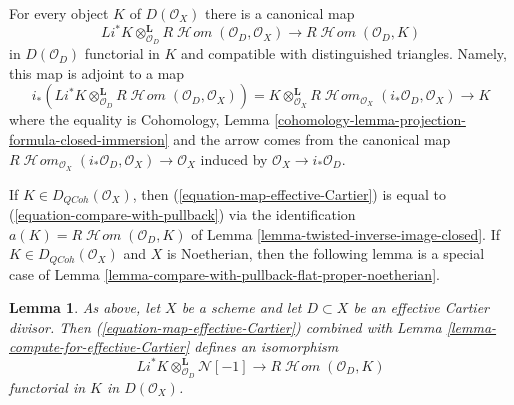 \documentclass{stacks-project}
\theoremstyle{plain}
\newtheorem{lemma}[subsection]{Lemma}
\theoremstyle{definition}
\theoremstyle{remark}
\numberwithin{equation}{subsection}
\def\SheafHom{\mathop{\mathcal{H}\!\mathit{om}}\nolimits}
\def\QCoh{\mathit{QCoh}}
\begin{document}
\noindent
For every object $K$ of $D(\mathcal{O}_X)$ there is a canonical map
\begin{equation}
\label{equation-map-effective-Cartier}
Li^*K
\otimes_{\mathcal{O}_D}^\mathbf{L}
R\SheafHom(\mathcal{O}_D, \mathcal{O}_X)
\longrightarrow
R\SheafHom(\mathcal{O}_D, K)
\end{equation}
in $D(\mathcal{O}_D)$ functorial in $K$ and
compatible with distinguished triangles.
Namely, this map is adjoint to a map
$$
i_*(Li^*K \otimes^\mathbf{L}_{\mathcal{O}_D}
R\SheafHom(\mathcal{O}_D, \mathcal{O}_X)) =
K \otimes^\mathbf{L}_{\mathcal{O}_X}
R\SheafHom_{\mathcal{O}_X}(i_*\mathcal{O}_D, \mathcal{O}_X)
\longrightarrow K
$$
where the equality is
Cohomology, Lemma \ref{cohomology-lemma-projection-formula-closed-immersion}
and the arrow comes from the canonical map
$R\SheafHom_{\mathcal{O}_X}(i_*\mathcal{O}_D, \mathcal{O}_X) \to \mathcal{O}_X$
induced by $\mathcal{O}_X \to i_*\mathcal{O}_D$.

\medskip\noindent
If $K \in D_\QCoh(\mathcal{O}_X)$, then
(\ref{equation-map-effective-Cartier}) is equal to
(\ref{equation-compare-with-pullback}) via the identification
$a(K) = R\SheafHom(\mathcal{O}_D, K)$ of
Lemma \ref{lemma-twisted-inverse-image-closed}.
If $K \in D_\QCoh(\mathcal{O}_X)$ and $X$ is Noetherian, then
the following lemma is a special case of
Lemma \ref{lemma-compare-with-pullback-flat-proper-noetherian}.

\begin{lemma}
\label{lemma-sheaf-with-exact-support-effective-Cartier}
As above, let $X$ be a scheme and let $D \subset X$ be an
effective Cartier divisor. Then (\ref{equation-map-effective-Cartier})
combined with Lemma \ref{lemma-compute-for-effective-Cartier}
defines an isomorphism
$$
Li^*K \otimes_{\mathcal{O}_D}^\mathbf{L} \mathcal{N}[-1]
\longrightarrow
R\SheafHom(\mathcal{O}_D, K)
$$
functorial in $K$ in $D(\mathcal{O}_X)$.
\end{lemma}
\end{document}
